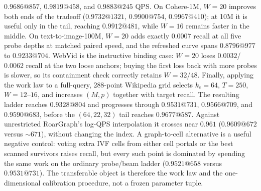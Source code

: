 \documentclass{article}
\begin{document}
{$0.9686@857$, $0.9819@458$, and $0.9883@245$ QPS.  On Cohere-1M, $W=20$
improves both ends of the tradeoff ($0.9732@1321$, $0.9900@754$,
$0.9967@410$); at 10M it is useful only in the tail, reaching
$0.9912@481$, while $W=16$ remains faster in the middle.  On text-to-image-100M,
$W=20$ adds exactly $0.0007$ recall at all five probe depths at matched paired
speed, and the refreshed curve spans $0.8796@977$ to $0.9233@704$.  WebVid is
the instructive binding case: $W=20$ loses $0.0032$/$0.0062$ recall at the two
loose anchors; buying the first loss back with more probes is slower, so its
containment check correctly retains $W=32$/$48$.  Finally, applying the work
law to a full-query, 288-point Wikipedia grid selects $k_e=64$, $T=250$,
$W=12$--$16$, and increases $(M,p)$ together with target recall.  The resulting
ladder reaches $0.9328@804$ and progresses through $0.9531@731$,
$0.9566@709$, and $0.9590@683$, before the $(64,22,32)$ tail reaches
$0.9677@587$.  Against unrestricted RoarGraph's log-QPS interpolation it crosses
near $0.961$ ($0.9609@672$ versus ${\sim}671$), without changing the index.  A graph-to-cell
alternative is a useful negative control: voting extra IVF cells from either
cell portals or the best scanned survivors raises recall, but every such point
is dominated by spending the same work on the ordinary probe/beam ladder
($0.9521@658$ versus $0.9531@731$).  The transferable object is therefore the
work law and the one-dimensional calibration procedure, not a frozen parameter
tuple.}
\end{document}
